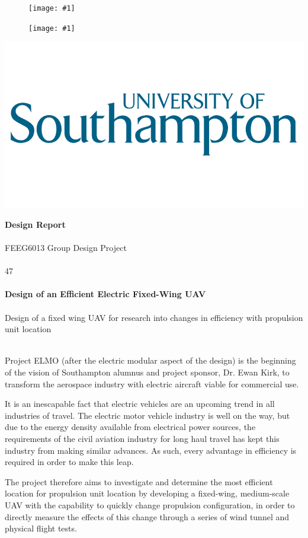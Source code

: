 \documentclass[11pt,landscape]{report}
\newcommand{\appendiximage}[2]{
    \begin{figure}[H]
        \begin{center}
        \texttt{[image: \#1]}
        \end{center}
    \end{figure}
}
\begin{document}
\begin{multicols*}{2}

    \appendiximage{elmo-logo}{0.75}
    \vspace{150px}
    \appendiximage{cover-image}{0.95}

\columnbreak
\columnbreak

\begin{titlepage}
    \begin{flushright}
    \includegraphics[width=0.3\columnwidth]{soton-logo}
    \end{flushright}
    \large{\textbf{Design Report}} \tiny{\\}\tiny{\\}
    \large{FEEG6013 Group Design Project} \\
    \vspace{1cm} \\
    \huge{47} \large{\\}\large{\\}
    \LARGE\textbf{Design of an Efficient Electric Fixed-Wing UAV} \large{\\}\large{\\}
    \large{Design of a fixed wing UAV for research into changes in efficiency with propulsion unit location} \large{\\}
    \vspace{1cm} \\
    \small{
        Project ELMO (after the electric modular aspect of the design) is the beginning of the vision of Southampton alumnus and project sponsor, Dr. Ewan Kirk, to transform the aerospace industry with electric aircraft viable for commercial use.
        
        It is an inescapable fact that electric vehicles are an upcoming trend in all industries of travel. 
        The electric motor vehicle industry is well on the way, but due to the energy density available from electrical power sources, the requirements of the civil aviation industry for long haul travel has kept this industry from making similar advances.
        As such, every advantage in efficiency is required in order to make this leap. 

        The project therefore aims to investigate and determine the most efficient location for propulsion unit location by developing a fixed-wing, medium-scale UAV with the capability to quickly change propulsion configuration, in order to directly measure the effects of this change through a series of wind tunnel and physical flight tests. 

}
\end{titlepage}
\end{multicols*}
\end{document}
